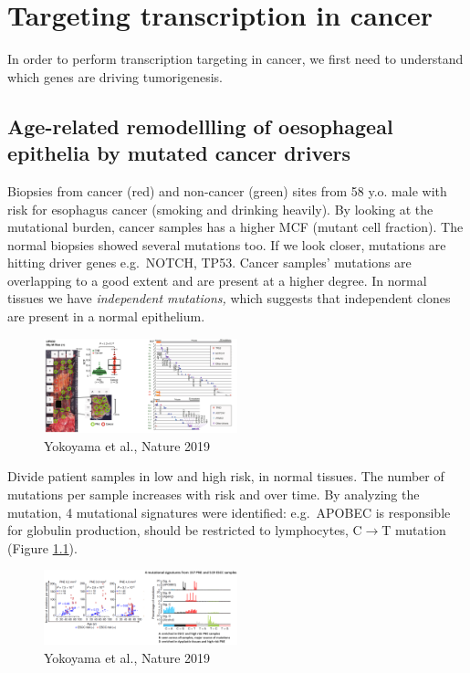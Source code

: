 \graphicspath{{chapters/_resources/}}

\chapter{Targeting transcription in cancer}
In order to perform transcription targeting in cancer, we first need to understand which genes are driving tumorigenesis.

\hypertarget{age-related-remodellling-of-oesophageal-epithelia-by-mutated-cancer-drivers}{%
\section{Age-related remodellling of oesophageal epithelia by mutated cancer drivers}\label{age-related-remodellling-of-oesophageal-epithelia-by-mutated-cancer-drivers}}

Biopsies from cancer (red) and non-cancer (green) sites from 58 y.o. male with risk for esophagus cancer (smoking and drinking heavily). By looking at the mutational burden, cancer samples has a higher MCF (mutant cell fraction). The normal biopsies showed several mutations too. If we look closer, mutations are hitting driver genes e.g.~NOTCH, TP53. Cancer samples' mutations are overlapping to a good extent and are present at a higher degree. In normal tissues we have \emph{independent mutations,} which suggests that independent clones are present in a normal epithelium.

\begin{figure}
\centering
\includegraphics[width=0.5\textwidth]{../_resources/Screen_Shot_2022-11-04_at_10-50-01.png}
\caption{Yokoyama et al., Nature 2019}
\end{figure}


Divide patient samples in low and high risk, in normal tissues. The number of mutations per sample increases with risk and over time. By analyzing the mutation, 4 mutational signatures were identified: e.g.~APOBEC is responsible for globulin production, should be restricted to lymphocytes, C$\rightarrow$T mutation (Figure \ref{fig:mosaic}).

\begin{figure}
\centering
\includegraphics[width=0.5\textwidth]{../_resources/Screen_Shot_2022-11-04_at_10-51-30.png}
\caption{Yokoyama et al., Nature 2019}
\label{fig:mosaic}
\end{figure}

